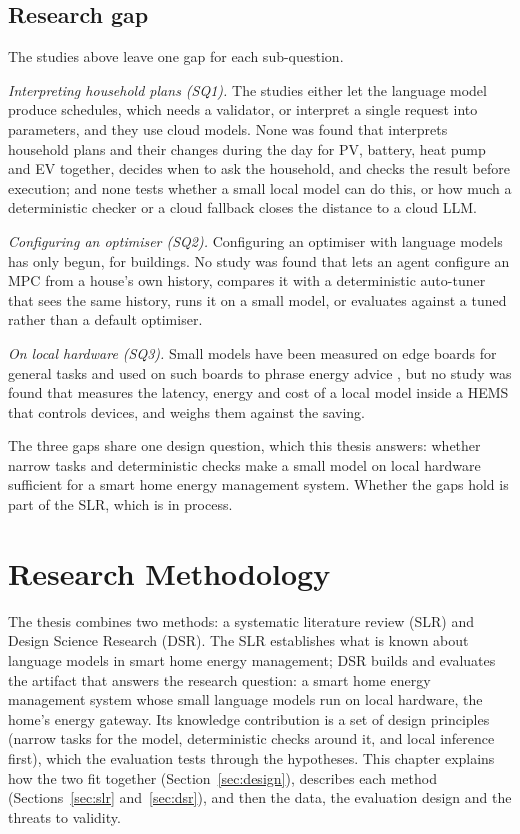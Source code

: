 \section{Research gap}

The studies above leave one gap for each sub-question.

\textit{Interpreting household plans (SQ1).} The studies either let the
language model produce schedules, which needs a validator, or interpret
a single request into parameters, and they use cloud models. None was
found that interprets household plans and their changes during the day
for PV, battery, heat pump and EV together, decides when to ask the
household, and checks the result before execution; and none tests
whether a small local model can do this, or how much a deterministic
checker or a cloud fallback closes the distance to a cloud LLM.

\textit{Configuring an optimiser (SQ2).} Configuring an optimiser with
language models has only begun, for buildings. No study was found that
lets an agent configure an MPC from a house's own history, compares it
with a deterministic auto-tuner that sees the same history, runs it on
a small model, or evaluates against a tuned rather than a default
optimiser.

\textit{On local hardware (SQ3).} Small models have been measured on
edge boards for general tasks \parencite{islam2025} and used on such
boards to phrase energy advice \parencite{spaias2027}, but no study was
found that measures the latency, energy and cost of a local model inside
a HEMS that controls devices, and weighs them against the saving.

The three gaps share one design question, which this thesis answers:
whether narrow tasks and deterministic checks make a small model on
local hardware sufficient for a smart home energy management system.
Whether the gaps hold is part of the SLR, which is in process.

\chapter{Research Methodology}
\label{ch:method}

The thesis combines two methods: a systematic literature review (SLR)
and Design Science Research (DSR). The SLR establishes what is known
about language models in smart home energy management; DSR builds and
evaluates the artifact that answers the research question: a smart home
energy management system whose small language models run on local
hardware, the home's energy gateway. Its knowledge contribution is a
set of design principles (narrow tasks for the model, deterministic
checks around it, and local inference first), which the evaluation
tests through the hypotheses. This chapter
explains how the two fit together (Section~\ref{sec:design}), describes
each method (Sections~\ref{sec:slr} and~\ref{sec:dsr}), and then the
data, the evaluation design and the threats to validity.

